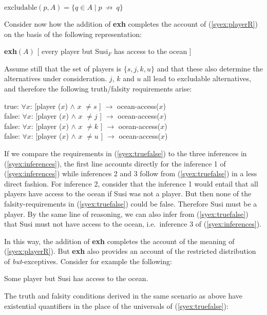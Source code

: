 \documentclass[output=paper,colorlinks,citecolor=brown,
]{langscibook}
\begin{document}
\ea \label{syexcludable}
$\text{excludable}(p,A) = \{q \in A \mid p\  \not\rightarrow\ q\}$\z


Consider now how the addition of \textbf{exh} completes the account of (\ref{syex:playerR}) on the basis of the following representation:

\ea \label{syex:playerLF}
     \textbf{exh}$(A)$ [ every player but Susi$_F$ has access to the ocean ]\z

Assume still that the set of players is $\{s, j, k, u\}$ and that these also determine the alternatives under consideration.
$j$, $k$ and $u$ all lead to excludable alternatives, and therefore the following truth/falsity requirements arise:

\ea \label{syex:truefalse}
    true: $\forall x$: [player ($x$) $\land$ $x$ $\neq s$ ] $\rightarrow$ ocean-access($x$)\\
    false: $\forall x$: [player ($x$) $\land$ $x$ $\neq j$ ] $\rightarrow$ ocean-access($x$)\\
	  false: $\forall x$: [player ($x$) $\land$ $x$ $\neq k$ ] $\rightarrow$ ocean-access($x$)\\
    false: $\forall x$: [player ($x$) $\land$ $x$ $\neq u$ ] $\rightarrow$ ocean-access($x$)\z

If we compare the requirements in (\ref{syex:truefalse}) to the three inferences in (\ref{syex:inferences}), the first line accounts directly for the inference 1 of (\ref{syex:inferences}) while inferences 2 and 3  follow from (\ref{syex:truefalse}) in a less direct fashion.
For inference 2, consider that the inference 1 would entail that all players have access to the ocean if Susi was not a player.
But then none of the falsity-requirements in (\ref{syex:truefalse}) could be false. Therefore Susi must be a player.
By the same line of reasoning, we can also infer from (\ref{syex:truefalse}) that Susi must not have access to the ocean, i.e.\ inference 3 of (\ref{syex:inferences}).

In this way, the addition of \textbf{exh} completes the account of the meaning of (\ref{syex:playerR}).  
But \textbf{exh} also provides an account of the restricted distribution of \emph{but}-exceptives. Consider for example the following:

\ea *Some player but Susi has access to the ocean.\z

The truth and falsity conditions derived in the same scenario as above have existential quantifiers in the place of the universals of (\ref{syex:truefalse}):
\end{document}
